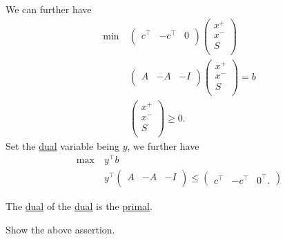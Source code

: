 \begin{explanation}
	We can further have
	\[
		\begin{aligned}
			\min~ & \begin{pmatrix}
				        c^{\top} & -c^{\top} & 0 \\
			        \end{pmatrix}\begin{pmatrix}
				                     x^+ \\
				                     x^- \\
				                     S   \\
			                     \end{pmatrix}    \\
			      & \begin{pmatrix}
				        A & -A & -I \\
			        \end{pmatrix}\begin{pmatrix}
				                     x^+ \\
				                     x^- \\
				                     S   \\
			                     \end{pmatrix} = b \\
			      & \begin{pmatrix}
				        x^+ \\
				        x^- \\
				        S   \\
			        \end{pmatrix}\geq 0.
		\end{aligned}
	\]
	Set the \hyperref[def:dual]{dual} variable being \(y\), we further have
	\[
		\begin{aligned}
			\max~ & y^{\top}b                                                    \\
			      & y^{\top} \begin{pmatrix}
				                 A & -A & -I \\
			                 \end{pmatrix} \leq \begin{pmatrix}
				                                    c^{\top} & -c^{\top} & 0^{\top}.
			                                    \end{pmatrix}
		\end{aligned}
	\]
\end{explanation}

\begin{note}
	The \hyperref[def:dual]{dual} of the \hyperref[def:dual]{dual} is the \hyperref[def:primal]{primal}.
\end{note}
\begin{exercise}
	Show the above assertion.
\end{exercise}